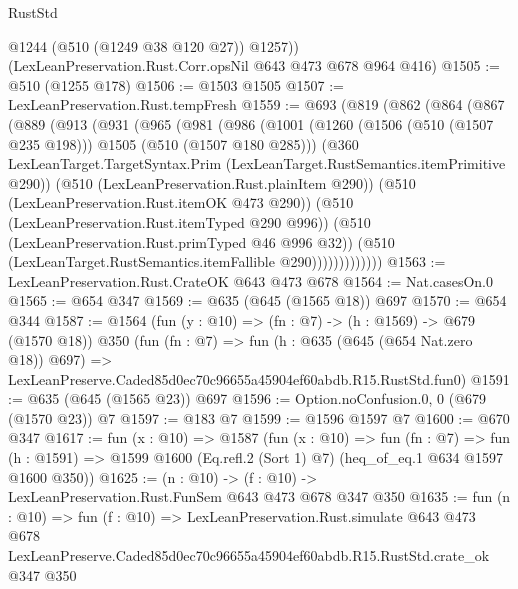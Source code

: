 \begin{lexlean}{RustStd}
\begin{coremodule}
        @1244
        (@510 (@1249 @38 @120 @27))
        @1257))
    (LexLeanPreservation.Rust.Corr.opsNil @643 @473 @678 @964 @416)
@1505 := @510 (@1255 @178)
@1506 := @1503 @1505
@1507 := LexLeanPreservation.Rust.tempFresh
@1559 := @693
    (@819
      (@862
        (@864
          (@867
            (@889
              (@913
                (@931
                  (@965
                    (@981
                      (@986
                        (@1001
                          (@1260 (@1506 (@510 (@1507 @235 @198))) @1505 (@510 (@1507 @180 @285)))
                          (@360
                            LexLeanTarget.TargetSyntax.Prim
                            (LexLeanTarget.RustSemantics.itemPrimitive @290))
                          (@510 (LexLeanPreservation.Rust.plainItem @290))
                          (@510 (LexLeanPreservation.Rust.itemOK @473 @290))
                          (@510 (LexLeanPreservation.Rust.itemTyped @290 @996))
                          (@510 (LexLeanPreservation.Rust.primTyped @46 @996 @32))
                          (@510 (LexLeanTarget.RustSemantics.itemFallible @290)))))))))))))
@1563 := LexLeanPreservation.Rust.CrateOK @643 @473 @678
@1564 := Nat.casesOn.{0}
@1565 := @654 @347
@1569 := @635 (@645 (@1565 @18)) @697
@1570 := @654 @344
@1587 := @1564
    (fun (y : @10) => (fn : @7) -> (h : @1569) -> @679 (@1570 @18))
    @350
    (fun (fn : @7) =>
    fun (h : @635 (@645 (@654 Nat.zero @18)) @697) =>
    LexLeanPreserve.Caded85d0ec70c96655a45904ef60abdb.R15.RustStd.fun0)
@1591 := @635 (@645 (@1565 @23)) @697
@1596 := Option.noConfusion.{0, 0} (@679 (@1570 @23)) @7
@1597 := @183 @7
@1599 := @1596 @1597 @7
@1600 := @670 @347
@1617 := fun (x : @10) =>
  @1587
    (fun (x : @10) =>
    fun (fn : @7) =>
    fun (h : @1591) => @1599 @1600 (Eq.refl.{2} (Sort 1) @7) (heq_of_eq.{1} @634 @1597 @1600 @350))
@1625 := (n : @10) -> (f : @10) -> LexLeanPreservation.Rust.FunSem @643 @473 @678 @347 @350
@1635 := fun (n : @10) =>
  fun (f : @10) =>
  LexLeanPreservation.Rust.simulate
    @643
    @473
    @678
    LexLeanPreserve.Caded85d0ec70c96655a45904ef60abdb.R15.RustStd.crate_ok
    @347
    @350
\end{coremodule}
\end{lexlean}
